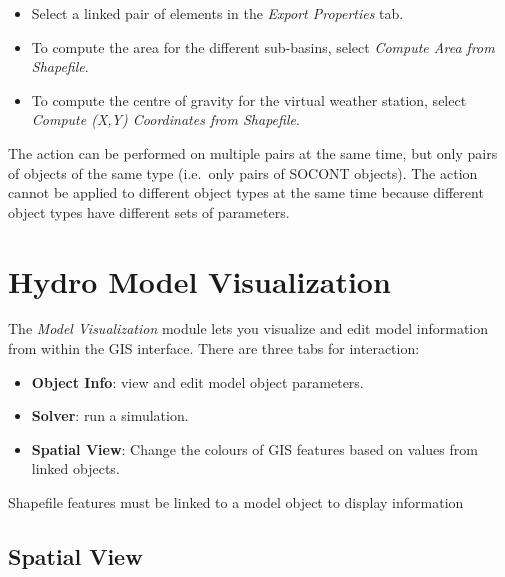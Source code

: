 \documentclass[
  letterpaper,
  DIV=11,
  numbers=noendperiod]{scrreprt}
\begin{document}
\begin{itemize}
\item
  {Select a linked pair of elements in the \emph{Export Properties}
  tab.}
\item
  {To compute the area for the different sub-basins, select
  \emph{Compute Area from Shapefile}.}
\item
  {To compute the centre of gravity for the virtual weather station,
  select \emph{Compute (X,Y) Coordinates from Shapefile}.}
\end{itemize}

The action can be performed on multiple pairs at the same time, but only
pairs of objects of the same type (i.e.~only pairs of SOCONT objects).
The action cannot be applied to different object types at the same time
because different object types have different sets of parameters.

\hypertarget{hydro-model-visualization}{%
\chapter{Hydro Model Visualization}\label{hydro-model-visualization}}

The \emph{Model Visualization} module lets you visualize and edit model
information from within the GIS interface. There are three tabs for
interaction:

\begin{itemize}
\item
  \textbf{Object Info}: view and edit model object parameters.
\item
  \textbf{Solver}: run a simulation.
\item
  \textbf{Spatial View}: Change the colours of GIS features based on
  values from linked objects.
\end{itemize}

\begin{tcolorbox}[standard jigsaw,left=2mm, arc=.35mm, toprule=.15mm, colbacktitle=quarto-callout-important-color!10!white, coltitle=black, leftrule=.75mm, bottomtitle=1mm, colframe=quarto-callout-important-color-frame, colback=white, toptitle=1mm, titlerule=0mm, rightrule=.15mm, title=\textcolor{quarto-callout-important-color}{\faExclamation}\hspace{0.5em}{Important}, bottomrule=.15mm, opacityback=0, opacitybacktitle=0.6]
Shapefile features must be linked to a model object to display
information
\end{tcolorbox}

\hypertarget{spatial-view}{%
\section{Spatial View}\label{spatial-view}}
\end{document}

